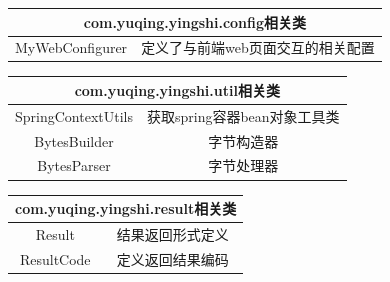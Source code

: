 \begin{tabular}{|c|c|} 
\hline 
\multicolumn{2}{|c|}{com.yuqing.yingshi.config相关类} \\ 
\hline 
MyWebConfigurer& 定义了与前端web页面交互的相关配置\\
\hline 
\end{tabular}

\begin{tabular}{|c|c|} 
\hline 
\multicolumn{2}{|c|}{com.yuqing.yingshi.util相关类} \\ 
\hline 
SpringContextUtils&获取spring容器bean对象工具类\\
BytesBuilder&字节构造器\\
BytesParser&字节处理器\\
\hline 
\end{tabular}

\begin{tabular}{|c|c|} 
\hline 
\multicolumn{2}{|c|}{com.yuqing.yingshi.result相关类} \\ 
\hline 
Result&结果返回形式定义\\
ResultCode&定义返回结果编码\\
\hline 
\end{tabular}
